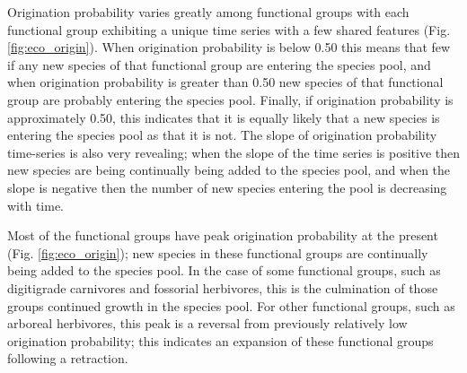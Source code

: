 \documentclass[12pt,letterpaper]{article}
\begin{document}
Origination probability varies greatly among functional groups with each functional group exhibiting a unique time series with a few shared features (Fig. \ref{fig:eco_origin}). When origination probability is below 0.50 this means that few if any new species of that functional group are entering the species pool, and when origination probability is greater than 0.50 new species of that functional group are probably entering the species pool. Finally, if origination probability is approximately 0.50, this indicates that it is equally likely that a new species is entering the species pool as that it is not. The slope of origination probability time-series is also very revealing; when the slope of the time series is positive then new species are being continually being added to the species pool, and when the slope is negative then the number of new species entering the pool is decreasing with time.

Most of the functional groups have peak origination probability at the present (Fig. \ref{fig:eco_origin}); new species in these functional groups are continually being added to the species pool. In the case of some functional groups,  such as digitigrade carnivores and fossorial herbivores, this is the culmination of those groups continued growth in the species pool. For other functional groups, such as arboreal herbivores, this peak is a reversal from previously relatively low origination probability; this indicates an expansion of these functional groups following a retraction.
\end{document}

